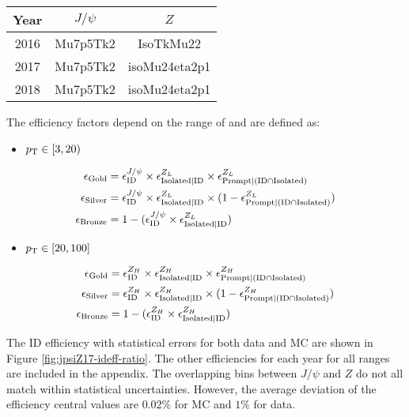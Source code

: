 \begin{tabular}{|c|c|c|}
\hline 
Year & $J/\psi$ & $Z$ \\ 
\hline 
2016 & Mu7p5Tk2 &  IsoTkMu22 \\ 
\hline 
2017 & Mu7p5Tk2 & isoMu24eta2p1 \\ 
\hline 
2018 & Mu7p5Tk2 & isoMu24eta2p1 \\ 
\hline 
\end{tabular} 



 The efficiency factors depend on the range of \pt and are defined as:


\begin{itemize}
\item[] $p_{\mathrm{T}} \in [3,20)$
\end{itemize}
\begin{equation}\label{eq:effcomp_J}
\begin{split}
\epsilon_{\text{Gold}}& = \epsilon_{\text{ID}}^{J/\psi}\times \epsilon_{\text{Isolated}|\text{ID}}^{Z_L} \times \epsilon_{\text{Prompt}|(\text{ID} \cap \text{Isolated})}^{Z_L} \\
\epsilon_{\text{Silver}}& = \epsilon_{\text{ID}}^{J/\psi} \times \epsilon_{\text{Isolated}|\text{ID}}^{Z_L} \times (1-\epsilon_{\text{Prompt}|(\text{ID} \cap \text{Isolated})}^{Z_L}) \\
\epsilon_{\text{Bronze}}& = 1-(\epsilon_{\text{ID}}^{J/\psi} \times \epsilon_{\text{Isolated}|\text{ID}}^{Z_L})
\end{split}
\end{equation}
\begin{itemize}
\item[] $p_{\mathrm{T}} \in [20,100 ]$
\end{itemize}
\begin{equation}\label{eq:effcomp_Z}
\begin{split}
\epsilon_{\text{Gold}}& = \epsilon_{\text{ID}}^{Z_H}\times\epsilon_{\text{Isolated}|\text{ID}}^{Z_H}\times\epsilon_{\text{Prompt}|(\text{ID} \cap \text{Isolated})}^{Z_H} \\
\epsilon_{\text{Silver}}& = \epsilon_{\text{ID}}^{Z_H}\times\epsilon_{\text{Isolated}|\text{ID}}^{Z_H}\times(1-\epsilon_{\text{Prompt}|(\text{ID} \cap \text{Isolated})}^{Z_H})\\
\epsilon_{\text{Bronze}}& = 1-(\epsilon_{\text{ID}}^{Z_H} \times \epsilon_{\text{Isolated}|\text{ID}}^{Z_H})
\end{split}
\end{equation}

 The ID efficiency with statistical errors for both data and MC are shown in Figure \ref{fig:jpsiZ17-ideff-ratio}. The other efficiencies for each year for all \pt ranges are included in the appendix. The overlapping bins between $J/\psi$ and $Z$ do not all match within statistical uncertainties. However, the average deviation of the efficiency central values are $0.02\%$ for MC and $1\%$ for data.  



